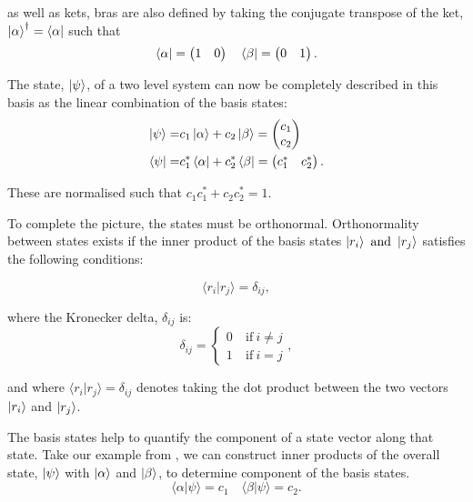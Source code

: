 as well as kets, bras are also defined by taking the conjugate transpose of the ket, $\ket{\alpha}^{\dagger} =
\bra{\alpha}$ such that
\begin{equation}
  \bra{\alpha} = \begin{pmatrix}
    1 & 0
\end{pmatrix}\quad
  \bra{\beta} = \begin{pmatrix}
  0 & 1
\end{pmatrix}.
\end{equation}

The state, $\ket{\psi}$, of a two level system can now be completely described in this basis
as the linear combination of the basis states:
\begin{align}\label{eqn:zeeman}
  \ket{\psi} =& c_1\ket{\alpha} + c_2\ket{\beta} = \begin{pmatrix}
    c_1\\
    c_2
\end{pmatrix}\\
  \bra{\psi} =& c_1^*\bra{\alpha} + c_2^*\bra{\beta} = \begin{pmatrix}
    c_1^* & c_2^*
\end{pmatrix}.
\end{align}

These are normalised such that $c_1c_1^* + c_2c_2^* = 1$.

To complete the picture, the states must be orthonormal. Orthonormality between states exists if the inner product
of the basis states $\ket{r_i} ~\text{and}~ \ket{r_j}$ satisfies the following conditions:

\begin{equation}
  \langle r_i\vert r_j\rangle = \delta_{ij},
\end{equation}

where the Kronecker delta, $\delta_{ij}$ is:
\begin{equation}
  \delta_{ij} = \begin{cases}
    0 & ~\text{if}~ i \ne j\\
    1 & ~\text{if}~ i = j
                \end{cases},
\end{equation}

and where $\langle r_i\vert r_j\rangle = \delta_{ij}$ denotes taking the dot product between the two
vectors $\ket{r_i}$ and $\ket{r_j}$.

The basis states help to quantify the component of a state vector along that state. Take our example
from , we can construct inner products of the overall state, $\ket{\psi}$ with $\ket{\alpha}$
and $\ket{\beta}$, to determine component of the basis states.
\begin{equation}
  \langle\alpha\vert\psi\rangle = c_1 \quad \langle\beta\vert\psi\rangle = c_2.
\end{equation}

